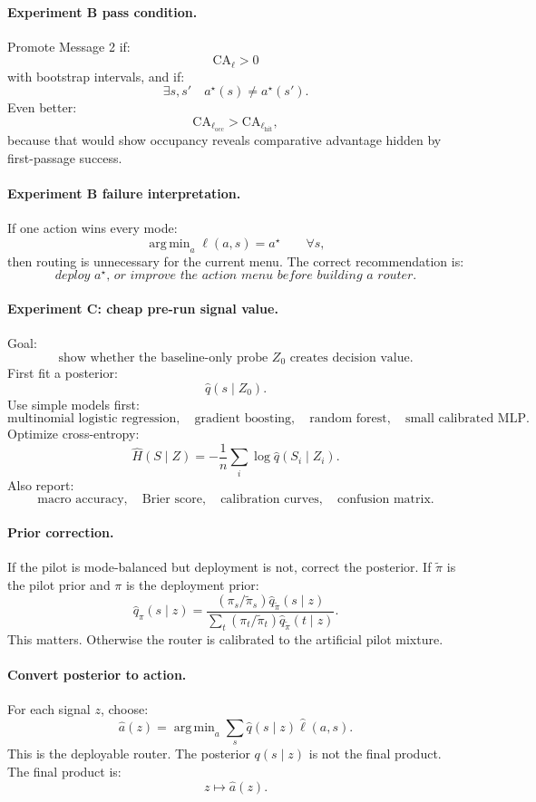 \documentclass{article}
\DeclareMathOperator*{\argmin}{arg\,min}
\begin{document}
\paragraph{Experiment B pass condition.}
Promote Message 2 if:
\[
    \mathrm{CA}_{\ell}>0
\]
with bootstrap intervals, and if:
\[
    \exists s,s'\quad a^\star(s)\neq a^\star(s').
\]
Even better:
\[
    \mathrm{CA}_{\ell_{\mathrm{occ}}}
    >
    \mathrm{CA}_{\ell_{\mathrm{hit}}},
\]
because that would show occupancy reveals comparative advantage hidden by first-passage success.

\paragraph{Experiment B failure interpretation.}
If one action wins every mode:
\[
    \argmin_a\ell(a,s)=a^\star
    \qquad\forall s,
\]
then routing is unnecessary for the current menu.
The correct recommendation is:
\[
    \textit{deploy \(a^\star\), or improve the action menu before building a router.}
\]

\paragraph{Experiment C: cheap pre-run signal value.}
Goal:
\[
    \text{show whether the baseline-only probe \(Z_0\) creates decision value.}
\]
First fit a posterior:
\[
    \hat q(s\mid Z_0).
\]
Use simple models first:
\[
    \text{multinomial logistic regression},
    \quad
    \text{gradient boosting},
    \quad
    \text{random forest},
    \quad
    \text{small calibrated MLP}.
\]
Optimize cross-entropy:
\[
    \widehat H(S\mid Z)
    =
    -\frac1n\sum_i\log \hat q(S_i\mid Z_i).
\]
Also report:
\[
    \text{macro accuracy},
    \quad
    \text{Brier score},
    \quad
    \text{calibration curves},
    \quad
    \text{confusion matrix}.
\]

\paragraph{Prior correction.}
If the pilot is mode-balanced but deployment is not, correct the posterior.
If \(\tilde\pi\) is the pilot prior and \(\pi\) is the deployment prior:
\[
    \hat q_\pi(s\mid z)
    =
    \frac{(\pi_s/\tilde\pi_s)\hat q_{\tilde\pi}(s\mid z)}
    {\sum_t(\pi_t/\tilde\pi_t)\hat q_{\tilde\pi}(t\mid z)}.
\]
This matters.
Otherwise the router is calibrated to the artificial pilot mixture.

\paragraph{Convert posterior to action.}
For each signal \(z\), choose:
\[
    \hat a(z)
    =
    \argmin_a\sum_s\hat q(s\mid z)\hat\ell(a,s).
\]
This is the deployable router.
The posterior \(q(s\mid z)\) is not the final product.
The final product is:
\[
    z\mapsto \hat a(z).
\]
\end{document}
